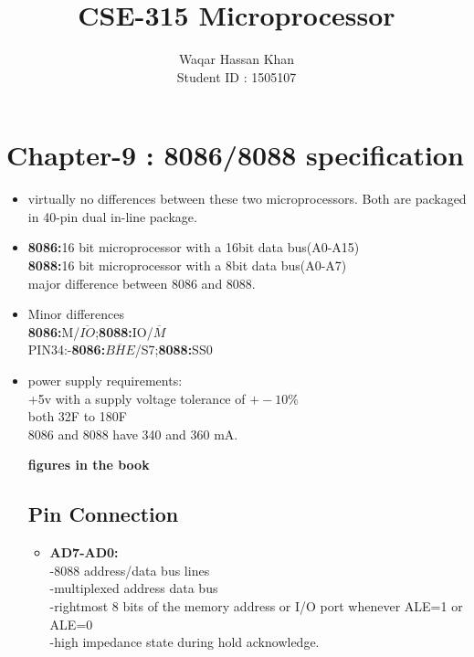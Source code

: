 \documentclass[12pt]{article}
\title{	
	\textbf{CSE-315 Microprocessor}
	\endgraf\bigskip
}
\author{
	\Large{Waqar Hassan Khan}\\
	\Large{Student ID : 1505107}
}
\date{}
\begin{document}
\maketitle

\newpage
\tableofcontents
\newpage

\section{Chapter-9 : 8086/8088 specification}

\begin{itemize}
	\item virtually no differences between these two microprocessors. Both are packaged in 40-pin dual in-line package.
	
	\item\textbf{8086:}16 bit microprocessor with a 16bit data bus(A0-A15)\\
	\textbf{8088:}16 bit microprocessor with a 8bit data bus(A0-A7)\\
	major difference between 8086 and 8088.
	
	\item Minor differences\\
	\textbf{8086:}M/$\overline{IO}$;\textbf{8088:}IO/$\overline{M}$\\
	PIN34:-\textbf{8086:}$\overline{BHE}$/S7;\textbf{8088:}SS0\\
	
	\item power supply requirements:\\
	+5v with a supply voltage tolerance of $+-10\%$\\
	both 32F to 180F\\
	8086 and 8088 have 340 and 360 mA.
	
	\textbf{figures in the book}
	
	\subsection{Pin Connection}
	\begin{itemize}
		\item \textbf{AD7-AD0:}\\
		-8088 address/data bus lines\\
		-multiplexed address data bus\\
		-rightmost 8 bits of the memory address or I/O port whenever ALE=1 or ALE=0\\
		-high impedance state during hold acknowledge.
		

\end{itemize}
\end{itemize}
\end{document}
